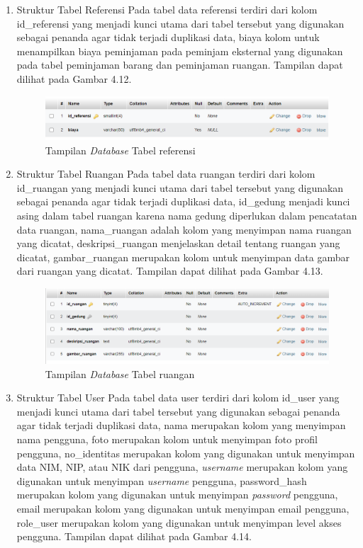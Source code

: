\begin{enumerate}
  \item Struktur Tabel Referensi
        Pada tabel data referensi terdiri dari kolom id\_referensi yang menjadi kunci utama dari tabel tersebut yang digunakan sebagai penanda agar tidak terjadi duplikasi data, biaya kolom untuk menampilkan biaya peminjaman pada peminjam eksternal yang digunakan pada tabel peminjaman barang dan peminjaman ruangan. Tampilan dapat dilihat pada Gambar 4.12.

        \begin{figure}
          \centering
          \includegraphics[width=0.82\linewidth]{konten//gambar/Tampilan database tabel referensi.png}
          \caption{Tampilan \textit{Database} Tabel referensi}
          \label{fig:enter-label}
        \end{figure}

  \item Struktur Tabel Ruangan
        Pada tabel data ruangan terdiri dari kolom id\_ruangan yang menjadi kunci utama dari tabel tersebut yang digunakan sebagai penanda agar tidak terjadi duplikasi data, id\_gedung menjadi kunci asing dalam tabel ruangan karena nama gedung diperlukan dalam pencatatan data ruangan, nama\_ruangan adalah kolom yang menyimpan nama ruangan yang dicatat, deskripsi\_ruangan menjelaskan detail tentang ruangan yang dicatat, gambar\_ruangan merupakan kolom untuk menyimpan data gambar dari ruangan yang dicatat. Tampilan dapat dilihat pada Gambar 4.13.

        \begin{figure}
          \centering
          \includegraphics[width=0.82\linewidth]{konten//gambar/Tampilan database tabel ruangan.png}
          \caption{Tampilan \textit{Database} Tabel ruangan}
          \label{fig:enter-label}
        \end{figure}

  \item Struktur Tabel User
        Pada tabel data user terdiri dari kolom id\_user yang menjadi kunci utama dari tabel tersebut yang digunakan sebagai penanda agar tidak terjadi duplikasi data, nama merupakan kolom yang menyimpan nama pengguna, foto merupakan kolom untuk menyimpan foto profil pengguna, no\_identitas merupakan kolom yang digunakan untuk menyimpan data NIM, NIP, atau NIK dari pengguna, \textit{username} merupakan kolom yang digunakan untuk menyimpan \textit{username} pengguna, password\_hash merupakan kolom yang digunakan untuk menyimpan \textit{password} pengguna, email merupakan kolom yang digunakan untuk menyimpan email pengguna, role\_user merupakan kolom yang digunakan untuk menyimpan level akses pengguna. Tampilan dapat dilihat pada Gambar 4.14.


\end{enumerate}
